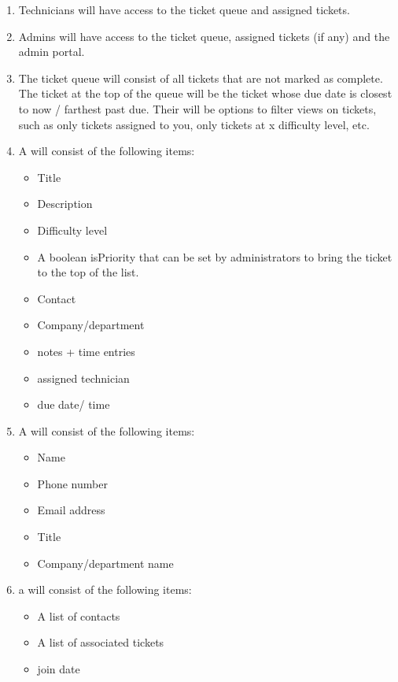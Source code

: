 \documentclass[letterpaper]{article}
\begin{document}
\begin{enumerate}
	\item Technicians will have access to the ticket queue and assigned tickets.
	\item Admins will have access to the ticket queue, assigned tickets (if any) and the admin portal.
	\item The ticket queue will consist of all tickets that are not marked as complete. The ticket at the top of the queue will be the ticket whose due date is closest to now / farthest past due. Their will be options to filter views on tickets, such as only tickets assigned to you, only tickets at x difficulty level, etc.
	\item A  will consist of the following items:
	      \begin{itemize}
		      \item Title
		      \item Description
		      \item Difficulty level
		      \item A boolean isPriority that can be set by administrators to bring the ticket to the top of the list.
		      \item Contact
		      \item Company/department
		      \item notes + time entries
		      \item assigned technician
		      \item due date/ time
	      \end{itemize}
	\item A  will consist of the following items:
	      \begin{itemize}
		      \item Name
		      \item Phone number
		      \item Email address
		      \item Title
		      \item Company/department name
	      \end{itemize}
	\item a  will consist of the following items:
	      \begin{itemize}
		      \item A list of contacts
		      \item A list of associated tickets
		      \item join date
	      \end{itemize}

\end{enumerate}
\end{document}
